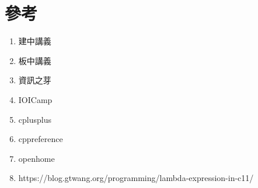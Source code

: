 \section{參考}
\begin{enumerate}
\item 建中講義
\item 板中講義
\item 資訊之芽
\item IOICamp
\item cplusplus
\item cppreference
\item openhome
\item https://blog.gtwang.org/programming/lambda-expression-in-c11/
\end{enumerate}